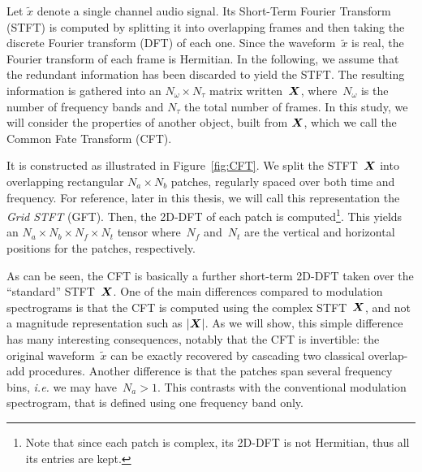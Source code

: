 Let $\tilde{x}$ denote a single channel audio signal.
Its Short-Term Fourier Transform (STFT) is computed by splitting it into overlapping frames and then taking the discrete Fourier transform (DFT) of each one.
Since the waveform~$\tilde{x}$ is real, the Fourier transform of
each frame is Hermitian. In the following, we assume that the redundant
information has been discarded to yield the STFT.
The resulting information is gathered into an $N_{\omega}\times N_{\tau}$
matrix written~${\bm{X}}$, where~$N_{\omega}$ is the number of frequency
bands and $N_{\tau}$ the total number of frames.
In this study, we will consider the properties of another object, built from ${\bm{X}}$, which we call the Common Fate Transform (CFT).
\par
It is constructed as illustrated in Figure~\ref{fig:CFT}.
We split the STFT~${\bm{X}}$ into overlapping rectangular $N_{a}\times N_{b}$ patches, regularly spaced over both time and frequency.
For reference, later in this thesis, we will call this representation the \emph{Grid STFT} (GFT).
Then, the 2D-DFT of each patch is computed\footnote{Note that since each patch is complex, its 2D-DFT is not Hermitian, thus all its entries are kept.}.
This yields an $N_{a}\times N_{b}\times N_{f}\times N_{t}$ tensor where~$N_{f}$ and~$N_{t}$ are the vertical and horizontal positions for the patches, respectively.
\par
As can be seen, the CFT is basically a further short-term 2D-DFT taken over the ``standard'' STFT~${\bm{X}}$.
One of the main differences compared to modulation spectrograms is that the CFT is computed using the complex STFT~${\bm{X}}$, and not a magnitude representation such as $\left|{\bm{X}}\right|$.
As we will show, this simple difference has many interesting consequences, notably that the CFT is invertible: the original waveform~$\tilde{x}$ can be exactly recovered by cascading two classical overlap-add procedures.
Another difference is that the patches span several frequency bins, \emph{i.e.} we may have~$N_{a}>1$.
This contrasts with the conventional modulation spectrogram, that is defined using one frequency band only.

